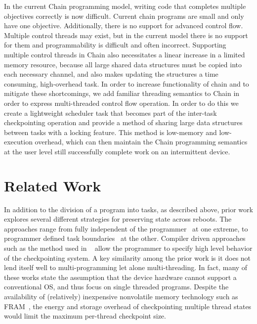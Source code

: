 \documentclass[11pt]{sensys-proc}
\begin{document}
In the current Chain programming model, writing code that completes multiple
objectives correctly is now difficult.  Current chain programs are small and
only have one objective. Additionally, there is no support for advanced control
flow.  Multiple control threads may exist, but in the current model there is no
support for them and programmability is difficult and often incorrect.
Supporting multiple control threads in Chain also necessitates a linear increase
in a limited memory resource, because all large shared data structures must be
copied into each necessary channel, and also makes updating the structures a
time consuming, high-overhead task.  In order to increase functionality of chain
and to mitigate these shortcomings, we add familiar threading semantics to Chain
in order to express multi-threaded control flow operation. In order to do this
we create a lightweight scheduler task that becomes part of the inter-task
checkpointing operation and provide a method of sharing large data structures
between tasks with a locking feature. This method is low-memory and
low-execution overhead, which can then maintain the Chain programming semantics
at the user level still successfully complete work on an intermittent device.



\section{Related Work}
In addition to the division of a program into tasks, as described above, prior work
explores several different strategies for preserving state across reboots. The approaches
range from fully independent of the programmer~\cite{ratchet, dewdrop} at one extreme, to programmer
defined task boundaries~\cite{Dino} at the other.  Compiler driven approaches such as the
method used in ~\cite{Mementos} allow the programmer to specify high level behavior of the
checkpointing system. A key similarity among the prior work is it
does not lend itself well to multi-programming let
alone multi-threading. In fact, many of these works state the assumption that the device
hardware cannot support a conventional OS, and thus focus on single threaded programs.
Despite the availability of (relatively) inexpensive nonvolatile memory technology such as
FRAM~\cite{quickrecall}, the energy and storage overhead of checkpointing multiple
thread states would limit the maximum per-thread checkpoint size.
\end{document}
